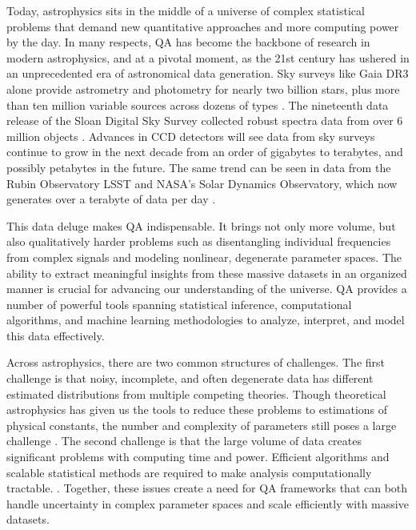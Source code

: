 \documentclass[preprint2,linenumbers,longauthor]{aastex631}
\begin{document}
Today, astrophysics sits in the middle of a universe of complex statistical problems that demand new quantitative approaches and more computing power by the day. In many respects, QA has become the backbone of research in modern astrophysics, and at a pivotal moment, as the 21st century has ushered in an unprecedented era of astronomical data generation. Sky surveys like Gaia DR3 alone provide astrometry and photometry for nearly two billion stars, plus more than ten million variable sources across dozens of types \citep{gaiacollaborationGaiaDataRelease2023}. The nineteenth data release of the Sloan Digital Sky Survey collected robust spectra data from over 6 million objects \citep{collaborationNineteenthDataRelease2025}. Advances in CCD detectors will see data from sky surveys continue to grow in the next decade from an order of gigabytes to terabytes, and possibly petabytes in the future. The same trend can be seen in data from the Rubin Observatory LSST and NASA's Solar Dynamics Observatory, which now generates over a terabyte of data per day \citep{borneAstroinformatics21stCentury2009}.

This data deluge makes QA indispensable. It brings not only more volume, but also qualitatively harder problems such as disentangling individual frequencies from complex signals and modeling nonlinear, degenerate parameter spaces. The ability to extract meaningful insights from these massive datasets in an organized manner is crucial for advancing our understanding of the universe. QA provides a number of powerful tools spanning statistical inference, computational algorithms, and machine learning methodologies to analyze, interpret, and model this data effectively.

Across astrophysics, there are two common structures of challenges. The first challenge is that noisy, incomplete, and often degenerate data has different estimated distributions from multiple competing theories. Though theoretical astrophysics has given us the tools to reduce these problems to estimations of physical constants, the number and complexity of parameters still poses a large challenge \citep{schaferFrameworkStatisticalInference2015}. The second challenge is that the large volume of data creates significant problems with computing time and power. Efficient algorithms and scalable statistical methods are required to make analysis computationally tractable. \citep{huijseComputationalIntelligenceChallenges2014}. Together, these issues create a need for QA frameworks that can both handle uncertainty in complex parameter spaces and scale efficiently with massive datasets.
\end{document}
